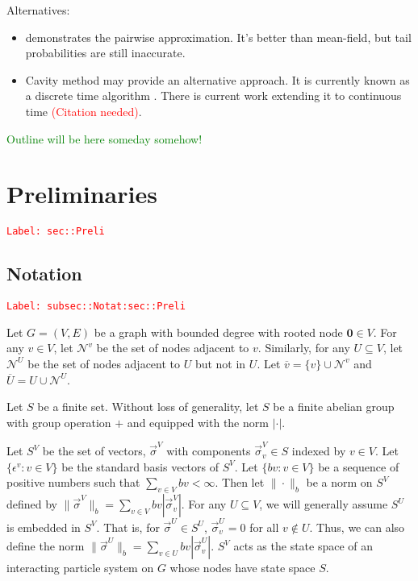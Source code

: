\documentclass[12pt]{article}
\newcommand{\mc}{\mathcal}
\newcommand{\ov}{\overline}
\newcommand{\ep}{\epsilon}
\newcommand{\tr}{\textcolor{red}}
\newcommand{\tg}{\textcolor{green}}
\newcommand{\labe}[1]{\tr{\texttt{Label: #1}}}
\newcommand{\ind}{\hspace{24pt}}
\renewcommand{\root}{\mathbf{0}}				%
\renewcommand{\v}{v}							%
\renewcommand{\U}{U}							%
\renewcommand{\S}{S}							%
\newcommand{\s}{\sigma}							%
\newcommand{\sv}{\vec{\s}}						%
\renewcommand{\b}{b}							%
\newcommand{\ev}{\ep}							%
\newcommand{\neigh}{\mc{N}}						%
\newcommand{\vind}[1]{^{#1}}					%
\newcommand{\carp}[1]{^{#1}}					%
\newcommand{\vsi}[1]{^{#1}}						%
\newcommand{\cind}[1]{_{#1}}					%
\newcommand{\cl}{\ov}							%
\begin{document}
Alternatives:

\begin{itemize}
\item \cite{Gas15} demonstrates the pairwise approximation. It's better than mean-field, but tail probabilities are still inaccurate.

\item Cavity method may provide an alternative approach. It is currently known as a discrete time algorithm \cite{Lac15}\cite{KanMon11}. There is current work extending it to continuous time \tr{(Citation needed)}.
\end{itemize}

\tg{Outline will be here someday somehow!}


\section{Preliminaries}
\label{sec::Preli}\labe{sec::Preli}

\subsection{Notation}
\label{subsec::Notat:sec::Preli}\labe{subsec::Notat:sec::Preli}

Let \(G = (V,E)\) be a graph with bounded degree with rooted node \(\root \in V\). For any \(\v \in V\), let \(\neigh\vind{\v}\) be the set of nodes adjacent to \(\v\). Similarly, for any \(\U \subseteq V\), let \(\neigh\vind{\U}\) be the set of nodes adjacent to \(\U\) but not in \(\U\). Let \(\cl{\v} = \{\v\}\cup\neigh\vind{\v}\) and \(\cl{\U} = \U\cup \neigh\vind{\U}\). 

\ind Let \(\S\) be a finite set. Without loss of generality, let \(\S\) be a finite abelian group with group operation \(+\) and equipped with the norm \(|\cdot|\). 

\ind Let \(\S\carp{V}\) be the set of vectors, \(\sv\cind{}\vsi{V}\) with components \(\sv\cind{\v}\vsi{V} \in \S\) indexed by \(\v\in V\). Let \(\{\ev\vind{\v}: \v\in V\}\) be the standard basis vectors of \(\S\carp{V}\). Let \(\{\b{\v}:\v\in V\}\) be a sequence of positive numbers such that \(\sum_{\v\in V} \b{\v} < \infty\). Then let \(\|\cdot\|_{\b{}}\) be a norm on \(\S\carp{V}\) defined by \(\|\sv\cind{}\vsi{V}\|_{\b{}} = \sum_{\v\in V} \b{\v}|\sv\cind{\v}\vsi{V}|\). For any \(\U\subseteq V\), we will generally assume \(\S\carp{\U}\) is embedded in \(\S\carp{V}\). That is, for \(\sv\cind{}\vsi{\U}\in \S\carp{\U}\), \(\sv\cind{\v}\vsi{\U} = 0\) for all \(\v\notin\U\). Thus, we can also define the norm \(\|\sv\cind{}\vsi{\U}\|_{\b{}} = \sum_{\v\in\U} \b{\v}|\sv\cind{\v}\vsi{\U}|\). \(\S\carp{V}\) acts as the state space of an interacting particle system on \(G\) whose nodes have state space \(\S\).
\end{document}
